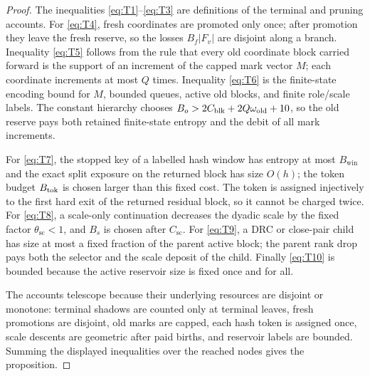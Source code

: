 \documentclass[11pt]{article}
\theoremstyle{remark}
\newcommand{\win}{\mathrm{win}}
\newcommand{\old}{\mathrm{old}}
\newcommand{\scal}{\mathrm{sc}}
\begin{document}
\begin{proof}
The inequalities \eqref{eq:T1}--\eqref{eq:T3} are definitions of the terminal and pruning accounts.  For \eqref{eq:T4}, fresh coordinates are promoted only once; after promotion they leave the fresh reserve, so the losses $B_f|F_v|$ are disjoint along a branch.  Inequality \eqref{eq:T5} follows from the rule that every old coordinate block carried forward is the support of an increment of the capped mark vector $M$; each coordinate increments at most $Q$ times.  Inequality \eqref{eq:T6} is the finite-state encoding bound for $M$, bounded queues, active old blocks, and finite role/scale labels.  The constant hierarchy chooses $B_o>2C_{\rm blk}+2Q\omega_{\old}+10$, so the old reserve pays both retained finite-state entropy and the debit of all mark increments.

For \eqref{eq:T7}, the stopped key of a labelled hash window has entropy at most $B_{\win}$ and the exact split exposure on the returned block has size $O(h)$; the token budget $B_{\rm tok}$ is chosen larger than this fixed cost.  The token is assigned injectively to the first hard exit of the returned residual block, so it cannot be charged twice.  For \eqref{eq:T8}, a scale-only continuation decreases the dyadic scale by the fixed factor $\theta_{\scal}<1$, and $B_s$ is chosen after $C_{\scal}$.  For \eqref{eq:T9}, a DRC or close-pair child has size at most a fixed fraction of the parent active block; the parent rank drop pays both the selector and the scale deposit of the child.  Finally \eqref{eq:T10} is bounded because the active reservoir size is fixed once and for all.

The accounts telescope because their underlying resources are disjoint or monotone: terminal shadows are counted only at terminal leaves, fresh promotions are disjoint, old marks are capped, each hash token is assigned once, scale descents are geometric after paid births, and reservoir labels are bounded.  Summing the displayed inequalities over the reached nodes gives the proposition.
\end{proof}
\end{document}
